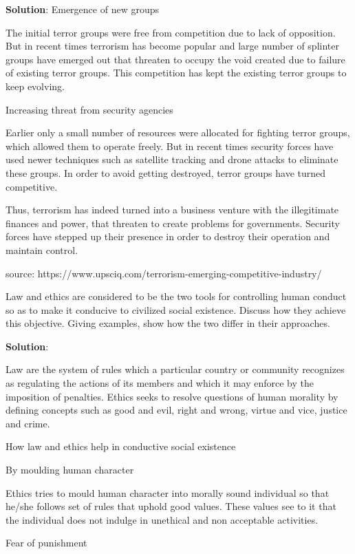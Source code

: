 \documentclass[
]{book}
\newcommand{\question}{\item}
\newenvironment{solution}{ {\bfseries Solution}:}{}
\begin{document}
\begin{questions}
\begin{solution}
Emergence of new groups

The initial terror groups were free from competition due to lack of opposition. But in recent times terrorism has become popular and large number of splinter groups have emerged out that threaten to occupy the void created due to failure of existing terror groups. This competition has kept the existing terror groups to keep evolving.

Increasing threat from security agencies

Earlier only a small number of resources were allocated for fighting terror groups, which allowed them to operate freely. But in recent times security forces have used newer techniques such as satellite tracking and drone attacks to eliminate these groups. In order to avoid getting destroyed, terror groups have turned competitive.

Thus, terrorism has indeed turned into a business venture with the illegitimate finances and power, that threaten to create problems for governments. Security forces have stepped up their presence in order to destroy their operation and maintain control.

source: https://www.upsciq.com/terrorism-emerging-competitive-industry/
\end{solution}

\question Law and ethics are considered to be the two tools for controlling human conduct so as to make it conducive to civilized social existence. Discuss how they achieve this objective. Giving examples, show how the two differ in their approaches.

\begin{solution}

Law are the system of rules which a particular country or community recognizes as regulating the actions of its members and which it may enforce by the imposition of penalties.
Ethics seeks to resolve questions of human morality by defining concepts such as good and evil, right and wrong, virtue and vice, justice and crime.

How law and ethics help in conductive social existence

By moulding human character

Ethics tries to mould human character into morally sound individual so that he/she follows set of rules that uphold good values. These values see to it that the individual does not indulge in unethical and non acceptable activities.

Fear of punishment


\end{solution}
\end{questions}
\end{document}
